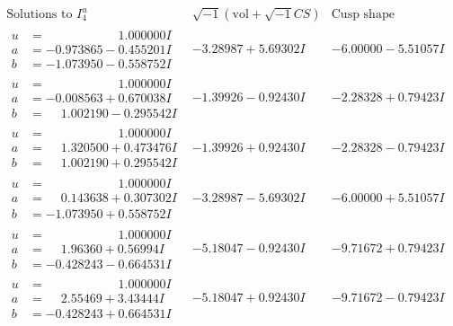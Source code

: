 \documentclass[1p]{elsarticle_modified}
\theoremstyle{definition}
\newcommand{\I}{\sqrt{-1}}
\begin{document}
$$\begin{array}{c|c|c}  
\text{Solutions to }I^u_{4}& \I (\text{vol} + \sqrt{-1}CS) & \text{Cusp shape}\\
 \hline 
\begin{aligned}
u &= \phantom{-0.000000 -}1.000000 I \\
a &= -0.973865 - 0.455201 I \\
b &= -1.073950 - 0.558752 I\end{aligned}
 & -3.28987 + 5.69302 I & -6.00000 - 5.51057 I \\ \hline\begin{aligned}
u &= \phantom{-0.000000 -}1.000000 I \\
a &= -0.008563 + 0.670038 I \\
b &= \phantom{-}1.002190 - 0.295542 I\end{aligned}
 & -1.39926 - 0.92430 I & -2.28328 + 0.79423 I \\ \hline\begin{aligned}
u &= \phantom{-0.000000 -}1.000000 I \\
a &= \phantom{-}1.320500 + 0.473476 I \\
b &= \phantom{-}1.002190 + 0.295542 I\end{aligned}
 & -1.39926 + 0.92430 I & -2.28328 - 0.79423 I \\ \hline\begin{aligned}
u &= \phantom{-0.000000 -}1.000000 I \\
a &= \phantom{-}0.143638 + 0.307302 I \\
b &= -1.073950 + 0.558752 I\end{aligned}
 & -3.28987 - 5.69302 I & -6.00000 + 5.51057 I \\ \hline\begin{aligned}
u &= \phantom{-0.000000 -}1.000000 I \\
a &= \phantom{-}1.96360 + 0.56994 I \\
b &= -0.428243 - 0.664531 I\end{aligned}
 & -5.18047 - 0.92430 I & -9.71672 + 0.79423 I \\ \hline\begin{aligned}
u &= \phantom{-0.000000 -}1.000000 I \\
a &= \phantom{-}2.55469 + 3.43444 I \\
b &= -0.428243 + 0.664531 I\end{aligned}
 & -5.18047 + 0.92430 I & -9.71672 - 0.79423 I \\ \hline\begin{aligned}

\end{aligned}
\end{array}$$
\end{document}

